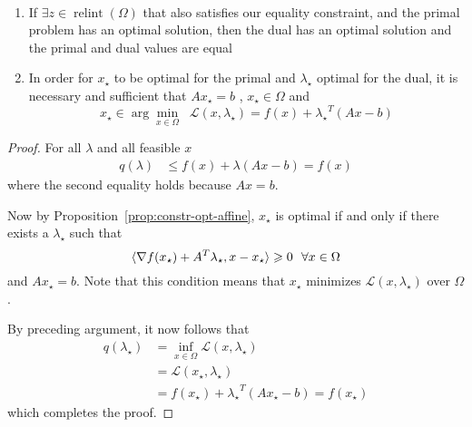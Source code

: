 \documentclass[12pt]{article}
\begin{document}
\begin{theorem}\quad\\
\begin{enumerate}
\item If $\exists z \in \operatorname{rel int} (\Omega) $ that also satisfies our equality constraint,  and the primal problem has an optimal solution, then the dual has an optimal solution and the primal and dual values are equal
\item In order for $x_\star$ to be optimal for the primal and $\lambda_\star$ optimal for the dual, it is necessary and sufficient that $Ax_\star = b$ , $x_\star \in \Omega$ and $$x_\star \in \arg\min_{x\in \Omega}\;\; \mathcal{L} (x , \lambda_\star) = f(x) + {\lambda_\star}^T (Ax - b)$$
\end{enumerate}
\end{theorem}
\begin{proof}
For all $\lambda$ and all feasible $x$
\begin{align*}
q(\lambda)&\leq  f(x) + \lambda(Ax -b)= f(x)
\end{align*}
where the second equality holds because $Ax=b$.

Now by Proposition~\ref{prop:constr-opt-affine}, $x_\star$ is optimal if and only if there exists a $\lambda_\star$ such that
\[
 \langle \nabla f(x_\star) + A^T \lambda_\star, x- x_\star \rangle \geq 0~~\forall x\in \Omega\\
 \]
and $Ax_\star=b$.  Note that this condition means that $x_\star$ minimizes $\mathcal{L}(x,\lambda_\star)$ over $\Omega$.

  By preceding argument, it now follows that
  \begin{align*} 
  q(\lambda_\star) &= \inf_{x \in \Omega} \mathcal{L}(x, \lambda_\star)\\
  &= \mathcal{L}(x_\star, \lambda_\star)\\
  & = f(x_\star) + {\lambda_\star}^T(Ax_\star - b) = f(x_\star)
  \end{align*}
  which completes the proof.
\end{proof}  


 
\end{document}

